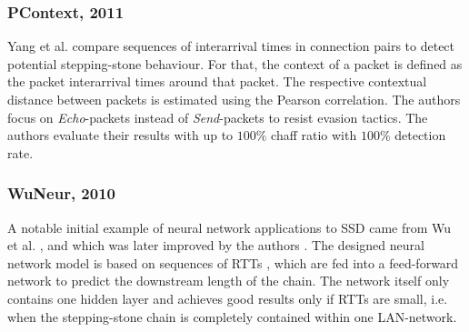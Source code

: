 \documentclass[runningheads,11pt]{llncs}\usepackage[]{graphicx}\usepackage[]{color}
\begin{document}



\subsubsection{PContext, 2011}

Yang et al. \cite{yang2011correlating} compare sequences of interarrival times in connection pairs to detect potential stepping-stone behaviour. For that, the context of a packet is defined as the packet interarrival times around that packet. The respective contextual distance between packets is estimated using the Pearson correlation. %
The authors focus on \textit{Echo}-packets instead of \textit{Send}-packets to resist evasion tactics.%
The authors evaluate their results with up to $100\%$ chaff ratio with $100\%$ detection rate.







\subsubsection{WuNeur, 2010}

A notable initial example of neural network applications to SSD came from Wu et al. \cite{wu2008performance}, and which was later improved by the authors \cite{wu2008performance}.
The designed neural network model is based on sequences of RTTs%
, which are fed into a feed-forward network to predict the downstream length of the chain. The network itself only contains one hidden layer and achieves good results only if RTTs are small, i.e. when the stepping-stone chain is completely contained within one LAN-network.
\end{document}
